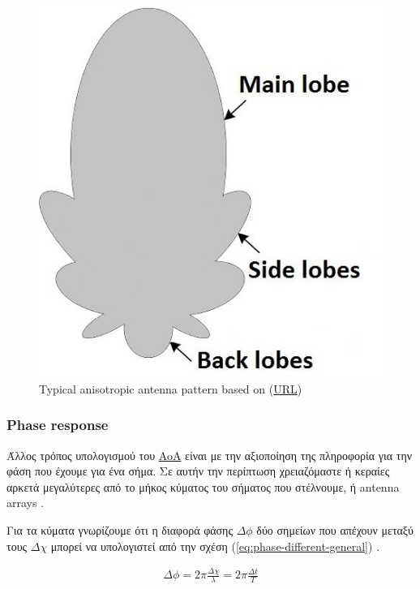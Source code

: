 \begin{figure} [H]
	\centering
	\includegraphics[scale=0.5]{Images/Theoretical-Background/A-typical-radiation-pattern-of-the-directive-antenna.jpeg}
	\decoRule
	\caption[Typical anisotropic antenna pattern]{Typical anisotropic antenna pattern based on \cite{wsn-Localization-techniques} (\href{https://www.sciencedirect.com/science/article/abs/pii/S1389128606003227}{URL})}
	\label{fig:Typical-anisotropic-antenna-pattern}
\end{figure}

\subsubsection{Phase response}
Άλλος τρόπος υπολογισμού του \hyperref[abbr:AoA]{AoA} είναι με την αξιοποίηση της πληροφορία για την φάση που έχουμε για ένα σήμα. Σε αυτήν την περίπτωση
χρειαζόμαστε ή κεραίες αρκετά μεγαλύτερες από το μήκος κύματος του σήματος που στέλνουμε, ή antenna arrays \cite{wsn-Localization-techniques}. 

Για τα κύματα γνωρίζουμε ότι η διαφορά φάσης $\Delta \phi$ δύο σημείων που απέχουν  
μεταξύ τους $\Delta \chi$ μπορεί να υπολογιστεί από την σχέση (\ref{eq:phase-different-general}) \cite{phase-difference}.

\begin{align}
	\Delta \phi = 2\pi\frac{\Delta \chi}{\lambda} = 2\pi\frac{\Delta t}{T} \label{eq:phase-different-general}
\end{align}

